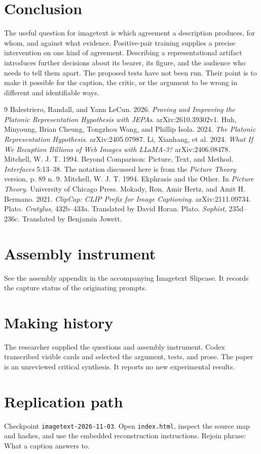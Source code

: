 \documentclass[11pt]{article}
\begin{document}
\section{Conclusion}
The useful question for imagetext is which agreement a description produces, for whom, and against what evidence. Positive-pair training supplies a precise intervention on one kind of agreement. Describing a representational artifact introduces further decisions about its bearer, its figure, and the audience who needs to tell them apart. The proposed tests have not been run. Their point is to make it possible for the caption, the critic, or the argument to be wrong in different and identifiable ways.

\begin{thebibliography}{9}
 Balestriero, Randall, and Yann LeCun. 2026. \emph{Proving and Improving the Platonic Representation Hypothesis with JEPAs}. arXiv:2610.39302v1.
 Huh, Minyoung, Brian Cheung, Tongzhou Wang, and Phillip Isola. 2024. \emph{The Platonic Representation Hypothesis}. arXiv:2405.07987.
 Li, Xianhang, et al. 2024. \emph{What If We Recaption Billions of Web Images with LLaMA-3?} arXiv:2406.08478.
 Mitchell, W. J. T. 1994. Beyond Comparison: Picture, Text, and Method. \emph{Interfaces} 5:13--38. The notation discussed here is from the \emph{Picture Theory} version, p. 89 n. 9.
 Mitchell, W. J. T. 1994. Ekphrasis and the Other. In \emph{Picture Theory}. University of Chicago Press.
 Mokady, Ron, Amir Hertz, and Amit H. Bermano. 2021. \emph{ClipCap: CLIP Prefix for Image Captioning}. arXiv:2111.09734.
 Plato. \emph{Cratylus}, 432b--433a. Translated by David Horan.
 Plato. \emph{Sophist}, 235d--236c. Translated by Benjamin Jowett.
\end{thebibliography}
\appendix
\section{Assembly instrument}
See the assembly appendix in the accompanying Imagetext Slipcase. It records the capture status of the originating prompts.
\section{Making history}
The researcher supplied the questions and assembly instrument. Codex transcribed visible cards and selected the argument, tests, and prose. The paper is an unreviewed critical synthesis. It reports no new experimental results.
\section{Replication path}
Checkpoint \texttt{imagetext-2026-11-03}. Open \texttt{index.html}, inspect the source map and hashes, and use the embedded reconstruction instructions. Rejoin phrase: What a caption answers to.
\end{document}
